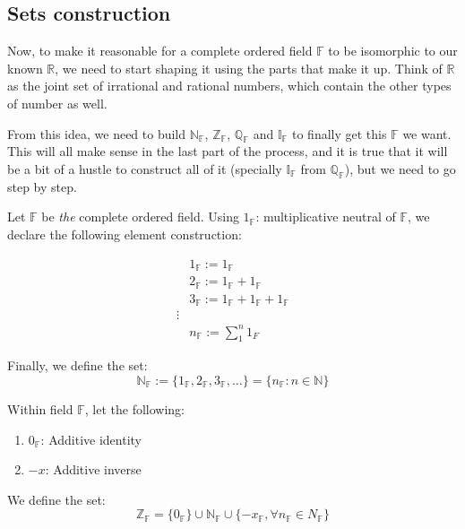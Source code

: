 \subsection{Sets construction}

Now, to make it reasonable for a complete ordered field $\mathbb{F}$ to be isomorphic to our known $\mathbb{R}$, we need to start shaping it using the parts that make it up. Think of $\mathbb{R}$ as the joint set of irrational and rational numbers, which contain the other types of number as well.



From this idea, we need to build $\mathbb{N_F}$, $\mathbb{Z_F}$, $\mathbb{Q_F}$ and $\mathbb{I_F}$ to finally get this $\mathbb{F}$ we want. This will all make sense in the last part of the process, and it is true that it will be a bit of a hustle to construct all of it (specially $\mathbb{I_F}$ from $\mathbb{Q_F}$), but we need to go step by step.


\begin{definition}
Let $\mathbb{F}$ be \textit{the} complete ordered field. Using $1_\mathbb{F}$: multiplicative neutral of $\mathbb{F}$, we declare the following element construction:

\begin{align*}
&1_\mathbb{F} := 1_\mathbb{F}\\
&2_\mathbb{F} := 1_\mathbb{F} + 1_\mathbb{F}\\
&3_\mathbb{F} := 1_\mathbb{F} + 1_\mathbb{F} + 1_\mathbb{F}\\
\vdots\\
&n_\mathbb{F} := \sum_{1}^{n}{1_F}
\end{align*}

Finally, we define the set:
$$\mathbb{N_F} := \{1_\mathbb{F}, 2_\mathbb{F}, 3_\mathbb{F}, \dots\} = \{n_\mathbb{F}: n \in \mathbb{N} \}$$
\end{definition}

\begin{definition}
Within field $\mathbb{F}$, let the following:
\begin{enumerate}
\item $0_\mathbb{F}$: Additive identity
\item $-x$: Additive inverse
\end{enumerate}

We define the set:
$$\mathbb{Z_F} = \{0_\mathbb{F}\} \cup \mathbb{N_F} \cup \{-x_\mathbb{F}, \forall n_\mathbb{F} \in N_\mathbb{F}\}$$
\end{definition}

